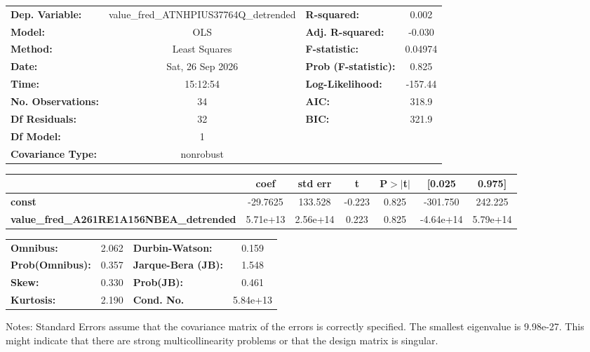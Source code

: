 \begin{center}
\begin{tabular}{lclc}
\toprule
\textbf{Dep. Variable:}                          & value\_fred\_ATNHPIUS37764Q\_detrended & \textbf{  R-squared:         } &     0.002   \\
\textbf{Model:}                                  &                  OLS                   & \textbf{  Adj. R-squared:    } &    -0.030   \\
\textbf{Method:}                                 &             Least Squares              & \textbf{  F-statistic:       } &   0.04974   \\
\textbf{Date:}                                   &            Sat, 26 Sep 2026            & \textbf{  Prob (F-statistic):} &    0.825    \\
\textbf{Time:}                                   &                15:12:54                & \textbf{  Log-Likelihood:    } &   -157.44   \\
\textbf{No. Observations:}                       &                     34                 & \textbf{  AIC:               } &     318.9   \\
\textbf{Df Residuals:}                           &                     32                 & \textbf{  BIC:               } &     321.9   \\
\textbf{Df Model:}                               &                      1                 & \textbf{                     } &             \\
\textbf{Covariance Type:}                        &               nonrobust                & \textbf{                     } &             \\
\bottomrule
\end{tabular}
\begin{tabular}{lcccccc}
                                                 & \textbf{coef} & \textbf{std err} & \textbf{t} & \textbf{P$> |$t$|$} & \textbf{[0.025} & \textbf{0.975]}  \\
\midrule
\textbf{const}                                   &     -29.7625  &      133.528     &    -0.223  &         0.825        &     -301.750    &      242.225     \\
\textbf{value\_fred\_A261RE1A156NBEA\_detrended} &     5.71e+13  &     2.56e+14     &     0.223  &         0.825        &    -4.64e+14    &     5.79e+14     \\
\bottomrule
\end{tabular}
\begin{tabular}{lclc}
\textbf{Omnibus:}       &  2.062 & \textbf{  Durbin-Watson:     } &    0.159  \\
\textbf{Prob(Omnibus):} &  0.357 & \textbf{  Jarque-Bera (JB):  } &    1.548  \\
\textbf{Skew:}          &  0.330 & \textbf{  Prob(JB):          } &    0.461  \\
\textbf{Kurtosis:}      &  2.190 & \textbf{  Cond. No.          } & 5.84e+13  \\
\bottomrule
\end{tabular}
\end{center}

Notes: \newline
 [1] Standard Errors assume that the covariance matrix of the errors is correctly specified. \newline
 [2] The smallest eigenvalue is 9.98e-27. This might indicate that there are \newline
 strong multicollinearity problems or that the design matrix is singular.